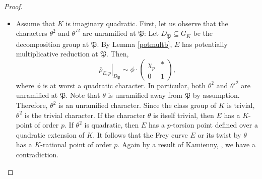 \documentclass[]{article}
\newcommand {\mfp}{{\mathfrak{P}}}
\begin{document}
\begin{proof}
\begin{enumerate}
\begin{itemize}
    \item Assume that $K$ is imaginary quadratic. First, let us observe that the characters $\theta^2$ and $\theta'^2$ are unramified at $\mfp$: Let $D_{\mfp}\subseteq G_K$ be the decomposition group at $\mfp$. By Lemma \ref{potmultb}, $E$ has potentially multiplicative reduction at $\mfp$. Then,
        \begin{equation*}
    \left.\bar{\rho}_{E, p}\right|_{D_{\mfp}}\sim\phi\cdot\left(\begin{array}{ll}
\chi_p & * \\
0 & 1
\end{array}\right)\text{,}
\end{equation*}where $\phi$ is at worst a quadratic character. In particular, both $\theta^2$ and $\theta'^2$ are unramified at $\mfp$. Note that $\theta$ is unramified away from $\mfp$ by assumption. Therefore, $\theta^2$ is an unramified character. Since the class group of $K$ is trivial, $\theta^2$ is the trivial character. If the character $\theta$ is itself trivial, then $E$ has a $K$-point of order $p$. If $\theta^2$ is quadratic, then $E$ has a $p$-torsion point defined over a quadratic extension of $K$. It follows that the Frey curve $E$ or its twist by $\theta$ has a $K$-rational point of order $p$. Again by a result of Kamienny, \cite[Theorem 3.1]{kamienny1992torsion}, we have a contradiction.
    \end{itemize}


\end{enumerate}
\end{proof}
\end{document}
